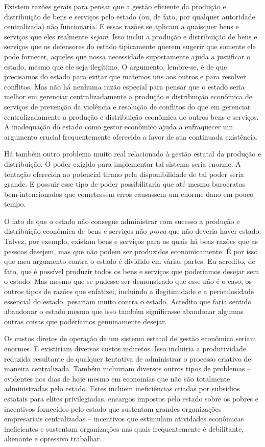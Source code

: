 Existem razões gerais para pensar que a gestão eficiente da produção e distribuição de bens e serviços pelo estado (ou, de fato, por qualquer autoridade centralizada) não funcionaria. E essas razões se aplicam a quaisquer bens e serviços que eles realmente \emph{sejam}. Isso inclui a produção e distribuição de bens e serviços que os defensores do estado tipicamente querem sugerir que somente ele pode fornecer, aqueles que nossa necessidade supostamente ajuda a justificar o estado, mesmo que ele seja ilegítimo. O argumento, lembre-se, é de que precisamos do estado para evitar que matemos uns aos outros e para resolver conflitos. Mas não há nenhuma razão especial para pensar que o estado seria melhor em gerenciar centralizadamente a produção e distribuição econômica de serviços de prevenção da violência e resolução de conflitos do que em gerenciar centralizadamente a produção e distribuição econômica de outros bens e serviços. A inadequação do estado como gestor econômico ajuda a enfraquecer um argumento crucial frequentemente oferecido a favor de sua continuada existência.

Há também outro problema muito real relacionado à gestão estatal da produção e distribuição. O poder exigido para implementar tal sistema seria enorme. A tentação oferecida ao potencial tirano pela disponibilidade de tal poder seria grande. E possuir esse tipo de poder possibilitaria que até mesmo burocratas bem-intencionados que cometessem erros causassem um enorme dano em pouco tempo.

O fato de que o estado não consegue administrar com sucesso a produção e distribuição econômica de bens e serviços não \emph{prova} que não deveria haver estado. Talvez, por exemplo, existam bens e serviços para os quais há boas razões que as pessoas desejem, mas que não podem ser produzidos economicamente. É por isso que meu argumento contra o estado é dividido em várias partes. Eu acredito, de fato, que é possível produzir todos os bens e serviços que poderíamos desejar sem o estado. Mas mesmo que se pudesse ser demonstrado que esse não é o caso, os outros tipos de razões que enfatizei, incluindo a ilegitimidade e a periculosidade essencial do estado, pesariam muito contra o estado. Acredito que faria sentido abandonar o estado mesmo que isso também significasse abandonar algumas outras coisas que poderíamos genuinamente desejar.

Os custos diretos de operação de um sistema estatal de gestão econômica seriam enormes. E existiriam diversos custos indiretos. Isso incluiria a produtividade reduzida resultante de qualquer tentativa de administrar o processo criativo de maneira centralizada. Também incluiriam diversos outros tipos de problemas -- evidentes nos dias de hoje mesmo em economias que não são totalmente administradas pelo estado. Estes incluem ineficiências criadas por subsídios estatais para elites privilegiadas, encargos impostos pelo estado sobre os pobres e incentivos fornecidos pelo estado que sustentam grandes organizações empresariais centralizadas -- incentivos que estimulam atividades econômicas ineficientes e sustentam organizações nas quais frequentemente é debilitante, alienante e opressivo trabalhar.

